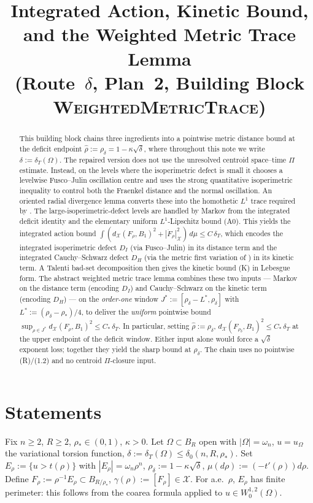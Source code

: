 \documentclass[11pt]{article}
\title{Integrated Action, Kinetic Bound,\\
       and the Weighted Metric Trace Lemma\\
       (Route~$\delta$, Plan~2, Building Block \textsc{WeightedMetricTrace})}
\author{}
\date{}
\theoremstyle{definition}
\newcommand{\Om}{\Omega}
\newcommand{\rstar}{\rho_{*}}
\newcommand{\rhad}{\widehat\rho}
\newcommand{\X}{\mathcal X}
\begin{document}
\maketitle

\begin{abstract}
This building block chains three ingredients into a pointwise metric
distance bound at the deficit endpoint $\rhad:=\rho_\delta=1-\kappa\sqrt{\delta}$,
where throughout this note we write $\delta:=\delta_T(\Om)$.
The repaired version does not use the unresolved centroid
space--time $\Pi$ estimate.  Instead, on the levels where the
isoperimetric defect is small it chooses a levelwise Fusco--Julin
oscillation centre and uses the strong quantitative isoperimetric
inequality to control both the Fraenkel distance and the normal
oscillation.  An oriented radial divergence lemma converts these into the
homothetic $L^1$ trace required by \cite{MetricFramework}.  The
large-isoperimetric-defect levels are handled by Markov from the
integrated deficit identity and the elementary uniform $L^1$-Lipschitz
bound (A0).  This yields the integrated action bound
$\int(d_\X(F_\rho,B_1)^2+|\dot F_\rho|_\X^2)\,d\mu \le C\,\delta_T$,
which encodes the integrated isoperimetric defect $D_I$ (via
Fusco--Julin) in its distance term and the integrated Cauchy--Schwarz
defect $D_H$ (via the metric first variation of \cite{MetricFramework})
in its kinetic term.  A Talenti bad-set decomposition then gives the
kinetic bound (K) in Lebesgue form.  The abstract weighted metric trace
lemma combines these two inputs --- Markov on the distance term
(encoding $D_I$) and Cauchy--Schwarz on the kinetic term (encoding
$D_H$) --- on the \emph{order-one} window
$J^*:=[\rho_\delta-L^*,\rho_\delta]$ with $L^*:=(\rho_\delta-\rstar)/4$,
to deliver the \emph{uniform} pointwise bound
$\sup_{\rho\in J^*} d_\X(F_\rho,B_1)^2\le C_*\,\delta_T$.
In particular, setting $\rhad:=\rho_\delta$,
$d_\X(F_{\rho_\delta},B_1)^2\le C_*\,\delta_T$ at the upper endpoint of
the deficit window.  Either input alone would force a $\sqrt{\delta}$
exponent loss; together they yield the sharp bound at $\rho_\delta$.
The chain uses no pointwise (R)/(1.2) and no centroid $\Pi$-closure input.
\end{abstract}

\section{Statements}\label{sec:statements}

Fix $n\ge 2$, $R\ge 2$, $\rstar\in(0,1)$, $\kappa>0$. Let $\Om\subset B_R$
open with $|\Om|=\omega_n$, $u=u_\Om$ the variational torsion function,
$\delta:=\delta_T(\Om)\le\delta_0(n,R,\rstar)$. Set $E_\rho:=\{u>t(\rho)\}$
with $|E_\rho|=\omega_n\rho^n$, $\rho_\delta:=1-\kappa\sqrt\delta$,
$\mu(d\rho):=(-t'(\rho))d\rho$. Define
$F_\rho:=\rho^{-1}E_\rho\subset B_{R/\rstar}$, $\gamma(\rho):=[F_\rho]\in\X$.
For a.e.\ $\rho$, $E_\rho$ has finite perimeter: this follows from the
coarea formula applied to $u\in W^{1,2}_0(\Om)$.
\end{document}
